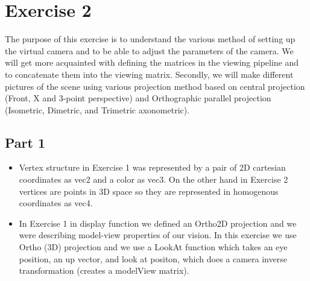 \chapter{Exercise 2}
The purpose of this exercise is to understand the various method of setting up
the virtual camera and to be able to adjust the parameters of the camera. We will
get more acquainted with defining the matrices in the viewing pipeline and to
concatenate them into the viewing matrix. Secondly, we will make different
pictures of the scene using various projection method based on central projection
(Front, X and 3-point perspective) and Orthographic parallel projection
(Isometric, Dimetric, and Trimetric axonometric).


\section{Part 1}
\begin{itemize}
\item Vertex structure in Exercise 1 was represented by a pair of 2D cartesian coordinates
as vec2 and a color as vec3. On the other hand in Exercise 2 vertices are points in
3D space so they are represented in homogenous coordinates as vec4.
\item In Exercise 1 in display function we defined an Ortho2D projection and we were describing
model-view properties of our vision. In this exercise we use Ortho (3D) projection and we use
a LookAt function which takes an eye position, an up vector, and look at positon, which does
a camera inverse transformation (creates a modelView matrix).
\end{itemize}
\clearpage

